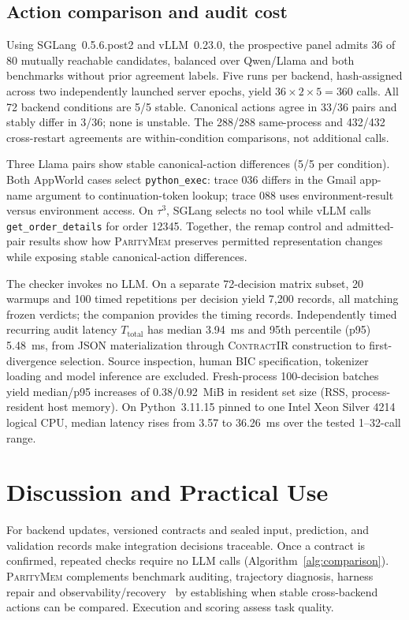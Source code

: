 \documentclass[letterpaper]{article}
\newcommand{\system}{\textsc{ParityMem}\xspace}
\newcommand{\contractir}{\textsc{ContractIR}\xspace}
\begin{document}
\subsection{Action comparison and audit cost}
Using SGLang~0.5.6.post2 and vLLM~0.23.0, the prospective panel admits 36 of
80 mutually reachable candidates, balanced over Qwen/Llama and both benchmarks
without prior agreement labels. Five runs per backend, hash-assigned across
two independently launched server epochs, yield $36\times2\times5=360$ calls.
All 72 backend conditions are 5/5 stable. Canonical actions agree in 33/36
pairs and stably differ in 3/36; none is unstable. The 288/288 same-process
and 432/432 cross-restart agreements are within-condition comparisons,
not additional calls.

Three Llama pairs show stable canonical-action differences (5/5 per condition). Both AppWorld
cases select \texttt{python\_exec}: trace 036 differs in the Gmail app-name
argument to continuation-token lookup; trace 088 uses environment-result
versus environment access. On $\tau^3$, SGLang selects no tool while vLLM
calls \texttt{get\_order\_details} for order 12345. Together, the remap control
and admitted-pair results show how \system preserves permitted representation
changes while exposing stable canonical-action differences.

The checker invokes no LLM. On a separate 72-decision matrix subset,
20 warmups and 100 timed repetitions per decision yield 7,200 records,
all matching frozen verdicts; the companion provides the timing records.
Independently timed recurring audit latency $T_{\mathrm{total}}$ has median
3.94~ms and 95th percentile (p95) 5.48~ms, from JSON materialization through
\contractir construction to first-divergence selection. Source inspection,
human BIC specification, tokenizer loading and model inference are excluded.
Fresh-process 100-decision batches yield median/p95 increases of
0.38/0.92~MiB in resident set size (RSS, process-resident host memory). On
Python~3.11.15 pinned to one Intel Xeon Silver 4214 logical CPU, median latency
rises from 3.57 to 36.26~ms over the tested 1--32-call range.

\section{Discussion and Practical Use}
For backend updates, versioned contracts and sealed input, prediction,
and validation records make integration decisions traceable. Once a contract
is confirmed, repeated checks require no LLM calls
(Algorithm~\ref{alg:comparison}). \system complements benchmark auditing,
trajectory diagnosis, harness repair and
observability/recovery~\cite{suh2026agentsuite,tu2026benchguard,wang2026aba,barke2026agentrx,chen2026harnessfix,zhu2026agentdebugx}
by establishing when stable cross-backend actions can be compared.
Execution and scoring assess task quality.
\end{document}
